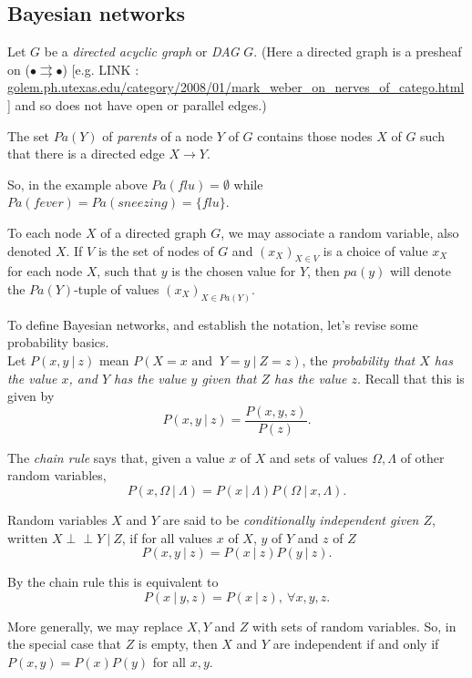 \documentclass[11pt, oneside]{article}   	%
\def\ci{\perp\!\!\!\perp}
\begin{document}
\subsection{Bayesian networks}
Let $G$ be a \emph{directed acyclic graph} or \emph{DAG} $G$. (Here a directed graph is a presheaf on ($ \bullet \rightrightarrows \bullet$) [e.g. LINK : \href{https://golem.ph.utexas.edu/category/2008/01/mark_weber_on_nerves_of_catego.html}{golem.ph.utexas.edu/category/2008/01/mark\_weber\_on\_nerves\_of\_catego.html}] and so does not have open or parallel edges.)

The set $Pa(Y)$ of \emph{parents} of a node $Y$ of $G$ contains those nodes $X$ of $G$ such that there is a directed edge $X \to Y$.

So, in the example above $Pa(flu) = \emptyset$ while $Pa(fever) = Pa(sneezing) = \{ flu \}$.


To each node $X$ of a directed graph $G$, we may associate a random variable, also denoted $X$. If $V$ is the set of nodes of $G$ and $(x_X)_{X \in V}$ is a choice of value $x_X$ for each node $X$, such that $y$ is the chosen value for $Y$, then $pa(y)$ will denote the $Pa(Y)$-tuple of values $(x_X)_{X \in Pa(Y)}$. 


To define Bayesian networks, and establish the notation, let's revise some probability basics.
\\
Let $P(x,y \ | \ z)$ mean $P(X = x \text{ and } \ Y = y \ | \ Z = z)$, the \emph{probability that $X$ has the value $x$, and $Y$ has the value $y$ given that $Z$ has the value $z$}. Recall that this is given by
\[ P(x,y \ |\ z) = \frac{ P(x,y,z) }{P(z)}.\]

The \emph{chain rule} says that, given a value $x$ of $X$ and sets of values $\Omega, \Lambda$ of other random variables, 
\[ P(x, \Omega \ | \ \Lambda) = P( x \ | \ \Lambda) P( \Omega \ | \ x, \Lambda).\]

Random variables $X$ and $Y$ are said to be \emph{conditionally independent given $Z$}, written $X \ci Y \ | \ Z$, if for all values $x$ of $X$, $y$ of $Y$ and $z$ of $Z$
\[ P(x,y \ | \ z) = P(x \ | \ z) P(y \ | \ z).\]

By the chain rule this is equivalent to 
\[ P(x \ | \ y,z )  = P (x \ | \ z) , \ \forall x,y, z. \]

More generally, we may replace $X,Y$ and $Z$ with sets of random variables. So, in the special case that $Z$ is empty, then $X$ and $Y$ are independent if and only if $ P(x, y) = P(x)P(y)$ for all $x,y$.
\end{document}
